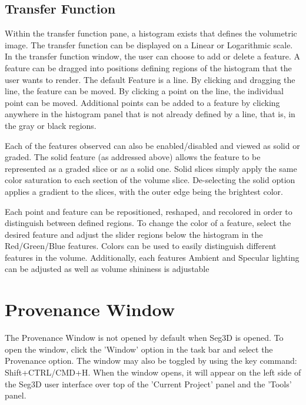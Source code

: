 \documentclass[fleqn,11pt,openany]{book}
\begin{document}


\subsection{Transfer Function}
Within the transfer function pane, a histogram exists that defines the volumetric image.
The transfer function can be displayed on a Linear or Logarithmic scale.
In the transfer function window, the user can choose to add or delete a feature.
A feature can be dragged into positions defining regions of the histogram that the user wants to render.
The default Feature is a line.  
By clicking and dragging the line, the feature can be moved.
By clicking a point on the line, the individual point can be moved.
Additional points can be added to a feature by clicking anywhere in the histogram panel  that is not already defined by a line, that is, in the gray or black regions.

Each of the features observed can also be enabled/disabled and viewed as solid or graded.
The solid feature (as addressed above) allows the feature to be represented as a graded slice or as a solid one.
Solid slices simply apply the same color saturation to each section of the volume slice.
De-selecting the solid option applies a gradient to the slices, with the outer edge being the brightest color.

Each point and feature can be repositioned, reshaped, and recolored in order to distinguish between defined regions.
To change the color of a feature, select the desired feature and adjust the slider regions below the histogram in the Red/Green/Blue features.
Colors can be used to easily distinguish different features in the volume.
Additionally, each features Ambient and Specular lighting can be adjusted as well as volume shininess is adjustable



\section{Provenance Window}
The Provenance Window is not opened by default when Seg3D is opened. 
To open the window, click the 'Window' option in the task bar and select the Provenance option.  
The window may also be toggled by using the key command: Shift+CTRL/CMD+H.
When the window opens, it will appear on the left side of the Seg3D user interface over top of the 'Current Project' panel and the 'Tools' panel.
\end{document}
